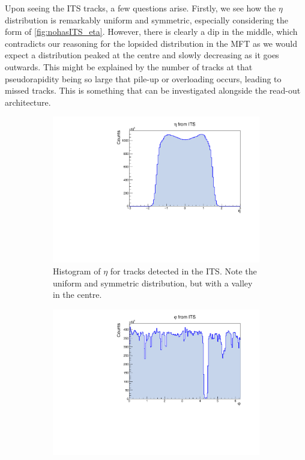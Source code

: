 Upon seeing the ITS tracks, a few questions arise. Firstly, we see how the $\eta$ distribution is remarkably uniform and symmetric, especially considering the form of \cref{fig:nohasITS_eta}. However, there is clearly a dip in the middle, which contradicts our reasoning for the lopsided distribution in the MFT as we would expect a distribution peaked at the centre and slowly decreasing as it goes outwards. This might be explained by the number of tracks at that pseudorapidity being so large that pile-up or overloading occurs, leading to missed tracks. This is something that can be investigated alongside the read-out architecture.

\begin{figure}[h]%
    \centering
    \begin{subfigure}[t]{.49\linewidth}
        \centering
        \includegraphics[width=\linewidth]{Plots/pass4_TracksIU/eta.pdf}
        \caption{Histogram of $\eta$ for tracks detected in the ITS. Note the uniform and symmetric distribution, but with a valley in the centre.}
        \label{fig:ITS_eta}
    \end{subfigure}
    \hfill
    \begin{subfigure}[t]{.49\linewidth}
        \centering
        \includegraphics[width=\linewidth]{Plots/pass4_TracksIU/phi.pdf}

\end{subfigure}
\end{figure}
